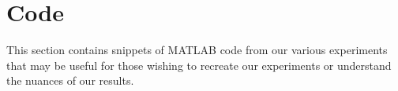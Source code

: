 \chapter{Code}
\label{sec:app-code}

This section contains snippets of MATLAB code from our various experiments that may be useful for those wishing to recreate our experiments or understand the nuances of our results.\\


\clearpage
\newpage
